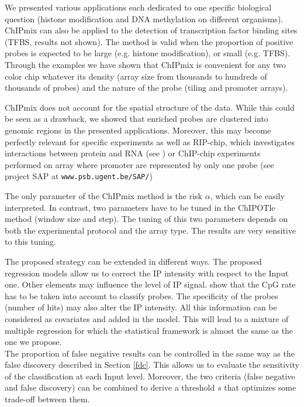 \documentclass{llncs}
\begin{document}
We presented various applications each dedicated to one specific
biological question (histone modification and DNA methylation on
different organisms). ChIPmix can also be applied to the detection
of transcription factor binding sites (TFBS, results not shown). The
method is valid when the proportion of positive probes is expected
to be large (e.g. histone modification), or small (e.g. TFBS).
Through the examples we have shown that ChIPmix is convenient for
any two color chip whatever its density (array size from thousands
to hundreds of thousands of probes) and the nature of the probe
(tiling and promoter arrays).

ChIPmix does not account for the spatial structure of the data.
While this could be seen as a drawback, we showed that enriched
probes are clustered into genomic regions in the presented
applications. Moreover, this may become perfectly relevant for
specific experiments as well as RIP-chip, which investigates
interactions between protein and RNA (see
\cite{Schmitz-Linneweber05}) or ChIP-chip experiments performed on
array where promoter are represented by only one probe (see project
SAP at {\tt www.psb.ugent.be/SAP/})

The only parameter of the ChIPmix method is the risk $\alpha$, which
can be easily interpreted. In contrast, two parameters have to be
tuned in the ChIPOTle method (window size and step). The tuning of
this two parameters depends on both the experimental protocol and
the array type. The results are very sensitive to this tuning.

The proposed strategy can be extended in different ways. The
proposed regression models allow us to correct the IP intensity with
respect to the Input one. Other elements may influence the level of
IP signal. \cite{Schubeler07} show that the CpG rate has to be taken
into account to classify probes. The specificity of the probes
(number of hits) may also alter the IP intensity. All this
information can be considered as covariates and added in the model.
This will lead to a mixture of multiple regression for which the
statistical framework is almost the same as the one we propose.\\
The proportion of false negative results can be controlled in the
same way as the false discovery described in Section \ref{fdc}. This
allows us to evaluate the sensitivity of the classification at each
Input level. Moreover, the two criteria (false negative and false
discovery) can be combined to derive a threshold $s$ that optimizes
some trade-off between them.
\end{document}
